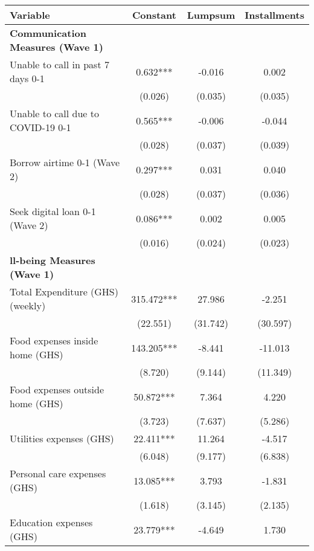 \begin{tabular}{lccc}
\hline
 Variable & Constant & Lumpsum & Installments \\ [0.1em] 
\hline\hline
\textbf{Communication Measures (Wave 1)} & & & \\ 
 Unable to call in past 7 days 0-1 & 0.632*** & -0.016 & 0.002 \\ [0.1em] 
                   &      (0.026)     &      (0.035)     &      (0.035)     \\ [0.1em] 
 Unable to call due to COVID-19 0-1 & 0.565*** & -0.006 & -0.044 \\ [0.1em] 
                   &      (0.028)     &      (0.037)     &      (0.039)     \\ [0.1em] 
 Borrow airtime 0-1 (Wave 2) & 0.297*** & 0.031 & 0.040 \\ [0.1em] 
                   &      (0.028)     &      (0.037)     &      (0.036)     \\ [0.1em] 
 Seek digital loan 0-1 (Wave 2) & 0.086*** & 0.002 & 0.005 \\ [0.1em] 
                   &      (0.016)     &      (0.024)     &      (0.023)     \\ [0.1em] 
\textbf{ll-being Measures (Wave 1)} & & & \\ 
 Total Expenditure (GHS) (weekly) & 315.472*** & 27.986 & -2.251 \\ [0.1em] 
                   &      (22.551)     &      (31.742)     &      (30.597)     \\ [0.1em] 
 Food expenses inside home (GHS) & 143.205*** & -8.441 & -11.013 \\ [0.1em] 
                   &      (8.720)     &      (9.144)     &      (11.349)     \\ [0.1em] 
 Food expenses outside home (GHS) & 50.872*** & 7.364 & 4.220 \\ [0.1em] 
                   &      (3.723)     &      (7.637)     &      (5.286)     \\ [0.1em] 
 Utilities expenses (GHS) & 22.411*** & 11.264 & -4.517 \\ [0.1em] 
                   &      (6.048)     &      (9.177)     &      (6.838)     \\ [0.1em] 
 Personal care expenses (GHS) & 13.085*** & 3.793 & -1.831 \\ [0.1em] 
                   &      (1.618)     &      (3.145)     &      (2.135)     \\ [0.1em] 
 Education expenses (GHS) & 23.779*** & -4.649 & 1.730 \\ [0.1em] 

\end{tabular}
